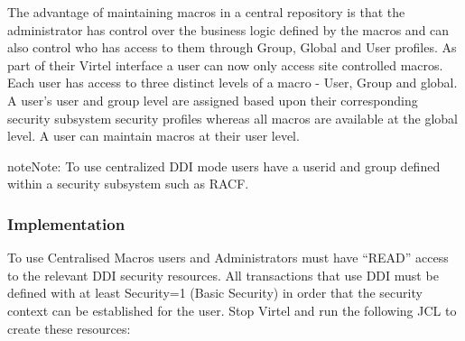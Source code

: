 \documentclass[letterpaper,10pt,english]{sphinxmanual}
\begin{document}
The advantage of maintaining macros in a central repository is that the administrator has control over the business logic defined by the macros and can also control who has access to them through Group, Global and User profiles. As part of their Virtel interface a user can now only access site controlled macros. Each user has access to three distinct levels of a macro - User, Group and global. A user’s user and group level are assigned based upon their corresponding security subsystem security profiles whereas all macros are available at the global level. A user can maintain macros at their user level.

\begin{sphinxadmonition}{note}{Note:}
To use centralized DDI mode users have a userid and group defined within a security subsystem such as RACF.
\end{sphinxadmonition}

\ignorespaces 

\subsubsection{Implementation}
\label{\detokenize{Customization:implementation}}\label{\detokenize{Customization:index-85}}
To use Centralised Macros users and Administrators must have “READ” access to the relevant DDI security resources. All transactions that use DDI must be defined with at least Security=1 (Basic Security) in order that the security context can be established for the user.  Stop Virtel and run the following JCL to create these resources:
\end{document}
